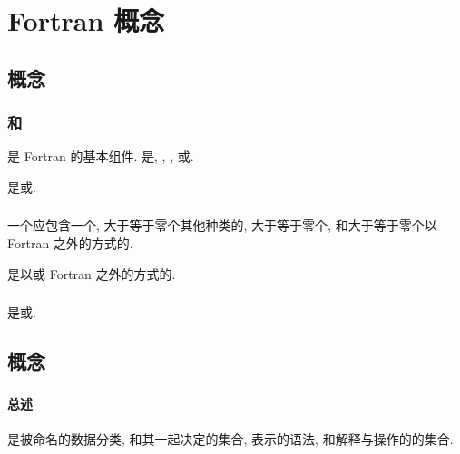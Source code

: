 \chapter{Fortran 概念}

\section{\ProgramUnit{}概念}

\subsection{\ProgramUnit{}和\ScopingUnit{}}

\ProgramUnit{}是 Fortran \Program{}的基本组件. \ProgramUnit{}是\MainProgram{}, \ExternalSubprogram{}, \Module{}, 或\Submodule{}.

\Subprogram{}是\Function{}\Subprogram{}或\Subroutine{}\Subprogram{}.

\subsection{\Program{}}

一个\Program{}应包含一个\MainProgram{}, 大于等于零个其他种类的\ProgramUnit{}, 大于等于零个\ExternalProcedure{}, 和大于等于零个以 Fortran 之外的方式\Define{}的\Entity{}.

\ExternalProcedure{}是以\ExternalSubprogram{}或 Fortran 之外的方式\Define{}的\Procedure{}.

\subsection{\Procedure{}}

\Procedure{}是\Function{}或\Subroutine{}.

\section{\Data{}概念}

\subsection{\Type{}}

\subsubsection{总述}

\Type{}是被命名的数据分类, 和其\TypeParameter{}一起决定\Value{}的集合, 表示\Value{}的语法, 和解释与操作\Value{}的\Operation{}的集合.

